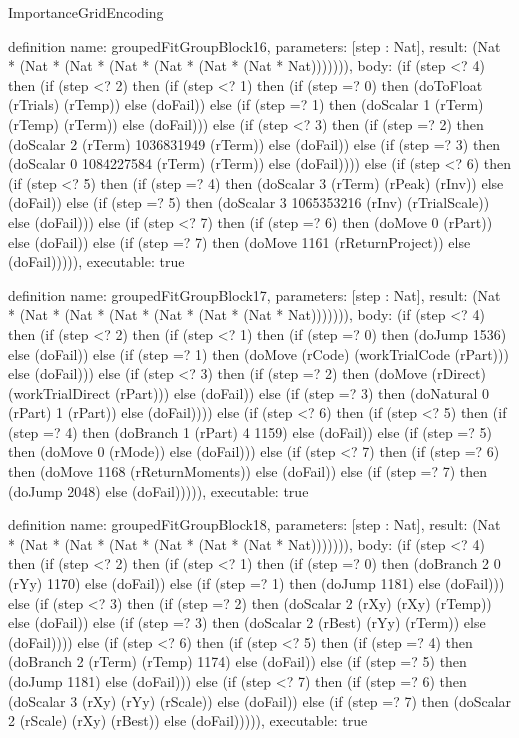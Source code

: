 \begin{lexlean}{ImportanceGridEncoding}
\begin{semanticmodule}
definition{
  name: groupedFitGroupBlock16,
  parameters: [step : Nat],
  result: (Nat * (Nat * (Nat * (Nat * (Nat * (Nat * (Nat * Nat))))))),
  body: (if (step <? 4) then
      (if (step <? 2) then
      (if (step <? 1) then
      (if (step =? 0) then (doToFloat (rTrials) (rTemp)) else (doFail)) else
      (if (step =? 1) then (doScalar 1 (rTerm) (rTemp) (rTerm)) else (doFail))) else
      (if (step <? 3) then
      (if (step =? 2) then (doScalar 2 (rTerm) 1036831949 (rTerm)) else (doFail)) else
      (if (step =? 3) then (doScalar 0 1084227584 (rTerm) (rTerm)) else (doFail)))) else
      (if (step <? 6) then
      (if (step <? 5) then
      (if (step =? 4) then (doScalar 3 (rTerm) (rPeak) (rInv)) else (doFail)) else
      (if (step =? 5) then (doScalar 3 1065353216 (rInv) (rTrialScale)) else (doFail))) else
      (if (step <? 7) then
      (if (step =? 6) then (doMove 0 (rPart)) else (doFail)) else
      (if (step =? 7) then (doMove 1161 (rReturnProject)) else (doFail))))),
  executable: true
}

definition{
  name: groupedFitGroupBlock17,
  parameters: [step : Nat],
  result: (Nat * (Nat * (Nat * (Nat * (Nat * (Nat * (Nat * Nat))))))),
  body: (if (step <? 4) then
      (if (step <? 2) then
      (if (step <? 1) then
      (if (step =? 0) then (doJump 1536) else (doFail)) else
      (if (step =? 1) then (doMove (rCode) (workTrialCode (rPart))) else (doFail))) else
      (if (step <? 3) then
      (if (step =? 2) then (doMove (rDirect) (workTrialDirect (rPart))) else (doFail)) else
      (if (step =? 3) then (doNatural 0 (rPart) 1 (rPart)) else (doFail)))) else
      (if (step <? 6) then
      (if (step <? 5) then
      (if (step =? 4) then (doBranch 1 (rPart) 4 1159) else (doFail)) else
      (if (step =? 5) then (doMove 0 (rMode)) else (doFail))) else
      (if (step <? 7) then
      (if (step =? 6) then (doMove 1168 (rReturnMoments)) else (doFail)) else
      (if (step =? 7) then (doJump 2048) else (doFail))))),
  executable: true
}

definition{
  name: groupedFitGroupBlock18,
  parameters: [step : Nat],
  result: (Nat * (Nat * (Nat * (Nat * (Nat * (Nat * (Nat * Nat))))))),
  body: (if (step <? 4) then
      (if (step <? 2) then
      (if (step <? 1) then
      (if (step =? 0) then (doBranch 2 0 (rYy) 1170) else (doFail)) else
      (if (step =? 1) then (doJump 1181) else (doFail))) else
      (if (step <? 3) then
      (if (step =? 2) then (doScalar 2 (rXy) (rXy) (rTemp)) else (doFail)) else
      (if (step =? 3) then (doScalar 2 (rBest) (rYy) (rTerm)) else (doFail)))) else
      (if (step <? 6) then
      (if (step <? 5) then
      (if (step =? 4) then (doBranch 2 (rTerm) (rTemp) 1174) else (doFail)) else
      (if (step =? 5) then (doJump 1181) else (doFail))) else
      (if (step <? 7) then
      (if (step =? 6) then (doScalar 3 (rXy) (rYy) (rScale)) else (doFail)) else
      (if (step =? 7) then (doScalar 2 (rScale) (rXy) (rBest)) else (doFail))))),
  executable: true
}


\end{semanticmodule}
\end{lexlean}
